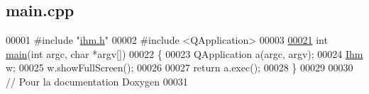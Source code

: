\hypertarget{main_8cpp_source}{}\subsection{main.\+cpp}

\begin{DoxyCode}
00001 \textcolor{preprocessor}{#include "\hyperlink{ihm_8h}{ihm.h}"}
00002 \textcolor{preprocessor}{#include <QApplication>}
00003 
\hyperlink{main_8cpp_ae0665038b72011f5c680c660fcb59459}{00021} \textcolor{keywordtype}{int} \hyperlink{main_8cpp_ae0665038b72011f5c680c660fcb59459}{main}(\textcolor{keywordtype}{int} argc, \textcolor{keywordtype}{char} *argv[])
00022 \{
00023     QApplication a(argc, argv);
00024     \hyperlink{class_ihm}{Ihm} w;
00025     w.showFullScreen();
00026 
00027     \textcolor{keywordflow}{return} a.exec();
00028 \}
00029 
00030 \textcolor{comment}{// Pour la documentation Doxygen}
00031 
\end{DoxyCode}
